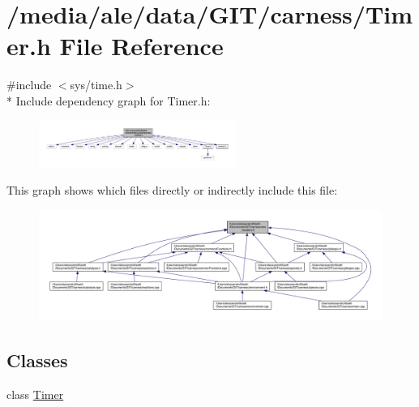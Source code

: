 \hypertarget{a00089}{\section{/media/ale/data/\-G\-I\-T/carness/\-Timer.h File Reference}
\label{a00089}
}
{\ttfamily \#include $<$sys/time.\-h$>$}\\*
Include dependency graph for Timer.\-h\-:\nopagebreak
\begin{figure}[H]
\begin{center}
\leavevmode
\includegraphics[width=182pt]{a00164}
\end{center}
\end{figure}
This graph shows which files directly or indirectly include this file\-:\nopagebreak
\begin{figure}[H]
\begin{center}
\leavevmode
\includegraphics[width=350pt]{a00165}
\end{center}
\end{figure}
\subsection*{Classes}
\begin{DoxyCompactItemize}
\item 
class \hyperlink{a00015}{Timer}
\end{DoxyCompactItemize}
